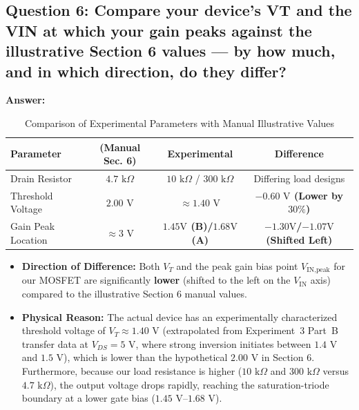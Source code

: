 \documentclass[11pt,a4paper]{article}
\begin{document}
\subsection{Question 6: Compare your device's VT and the VIN at which your gain peaks against the illustrative Section 6 values --- by how much, and in which direction, do they differ?}
\textbf{Answer:}
\begin{table}[H]
\centering
\caption{Comparison of Experimental Parameters with Manual Illustrative Values}
\begin{tabular}{p{4.5cm}ccc}
\toprule
\textbf{Parameter} & \textbf{(Manual Sec. 6)} & \textbf{Experimental} & \textbf{Difference} \\
\midrule
Drain Resistor & $4.7\text{ k}\Omega$ & $10\text{ k}\Omega$ / $300\text{ k}\Omega$ & Differing load designs \\
Threshold Voltage & $2.00\text{ V}$ & \textbf{$\approx 1.40\text{ V}$} & \textbf{$-0.60\text{ V}$ (Lower by $30\%$)} \\
Gain Peak Location & $\approx 3\text{ V}$ & \textbf{$1.45\text{V}$ (B)/$1.68\text{V}$(A)} & \textbf{$-1.30\text{V}$/$-1.07\text{V}$ (Shifted Left)} \\
\bottomrule
\end{tabular}
\end{table}
\begin{itemize}
    \item \textbf{Direction of Difference:} Both $V_T$ and the peak gain bias point $V_{\text{IN,peak}}$ for our MOSFET are significantly \textbf{lower} (shifted to the left on the $V_{\text{IN}}$ axis) compared to the illustrative Section 6 manual values.
    \item \textbf{Physical Reason:} The actual device has an experimentally characterized threshold voltage of $V_T \approx 1.40\text{ V}$ (extrapolated from Experiment~3 Part~B transfer data at $V_{DS} = 5\text{ V}$, where strong inversion initiates between $1.4\text{ V}$ and $1.5\text{ V}$), which is lower than the hypothetical $2.00\text{ V}$ in Section 6. Furthermore, because our load resistance is higher ($10\text{ k}\Omega$ and $300\text{ k}\Omega$ versus $4.7\text{ k}\Omega$), the output voltage drops rapidly, reaching the saturation-triode boundary at a lower gate bias ($1.45\text{ V}$--$1.68\text{ V}$).
\end{itemize}


\end{document}
